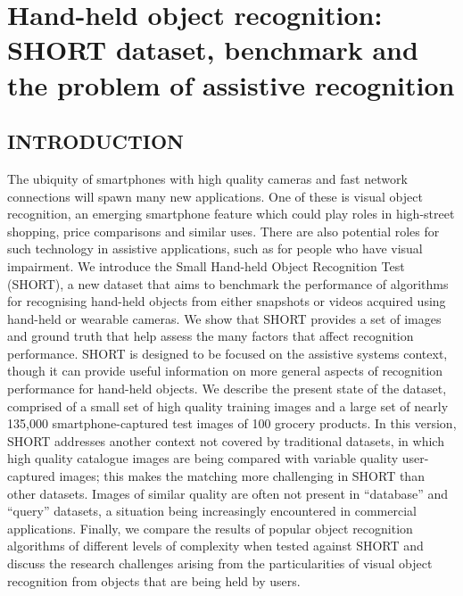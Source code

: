 \chapter{Hand-held object recognition: SHORT dataset, benchmark and the problem of assistive recognition}\label{ch:chapterSHORT}


\section{INTRODUCTION}
\label{sec:intro}

The ubiquity of smartphones with high quality cameras and fast network connections will spawn many new applications. One of these is visual object recognition, an emerging smartphone feature which could play roles in high-street shopping, price comparisons and similar uses. There are also potential roles for such technology in assistive applications, such as for people who have visual impairment. We introduce the Small Hand-held Object Recognition Test (SHORT), a new dataset that aims to benchmark the performance of algorithms for recognising hand-held objects from either snapshots or videos acquired using hand-held or wearable cameras. We show that SHORT provides a set of images and ground truth that help assess the many factors that affect recognition performance. SHORT is designed to be focused on the assistive systems context, though it can provide useful information on more general aspects of recognition performance for hand-held objects. We describe the present state of the dataset, comprised of a small set of high quality training images and a large set of nearly 135,000 smartphone-captured test images of 100 grocery products. In this version, SHORT addresses another context not covered by traditional datasets, in which high quality catalogue images are being compared with variable quality user-captured images; this makes the matching more challenging in SHORT than other datasets. Images of similar quality are often not present in ``database'' and ``query'' datasets, a situation being increasingly encountered in commercial applications. Finally, we compare the results of popular object recognition algorithms of different levels of complexity when tested against SHORT and discuss the research challenges arising from the particularities of visual object recognition from objects that are being held by users.


